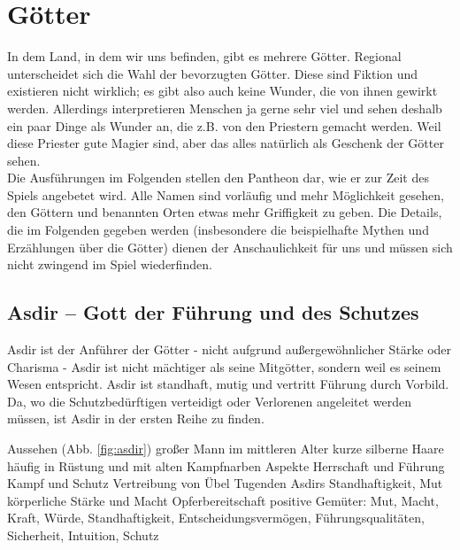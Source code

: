 \section{Götter}
In dem Land, in dem wir uns befinden, gibt es mehrere Götter. 
Regional unterscheidet sich die Wahl der bevorzugten Götter.
Diese sind Fiktion und existieren nicht wirklich; es gibt also auch keine Wunder, die von ihnen gewirkt werden. 
Allerdings interpretieren Menschen ja gerne sehr viel und sehen deshalb ein paar Dinge als Wunder an, die z.B. von den Priestern gemacht werden. 
Weil diese Priester gute Magier sind, aber das alles natürlich als Geschenk der Götter sehen.\\

Die Ausführungen im Folgenden stellen den Pantheon dar, wie er zur Zeit des Spiels angebetet wird.
Alle Namen sind vorläufig und mehr Möglichkeit gesehen, den Göttern und benannten Orten etwas mehr Griffigkeit zu geben.
Die Details, die im Folgenden gegeben werden (insbesondere die beispielhafte Mythen und Erzählungen über die Götter) dienen der Anschaulichkeit für uns und müssen sich nicht zwingend im Spiel wiederfinden.




\subsection{Asdir -- Gott der Führung und des Schutzes}
Asdir ist der Anführer der Götter - nicht aufgrund außergewöhnlicher Stärke oder Charisma - Asdir ist nicht mächtiger als seine Mitgötter, sondern weil es seinem Wesen entspricht. 
Asdir ist standhaft, mutig und vertritt Führung durch Vorbild. 
Da, wo die Schutzbedürftigen verteidigt oder Verlorenen angeleitet werden müssen, ist Asdir in der ersten Reihe zu finden.
\begin{outline}
	\1 Aussehen (Abb. \ref{fig:asdir})
		\2 großer Mann im mittleren Alter
		\2 kurze silberne Haare
		\2 häufig in Rüstung und mit alten Kampfnarben
	\1 Aspekte
		\2 Herrschaft und Führung
		\2 Kampf und Schutz
		\2 Vertreibung von Übel
	\1 Tugenden Asdirs
		\2 Standhaftigkeit, Mut
		\2 körperliche Stärke und Macht
		\2 Opferbereitschaft
	\1 positive Gemüter: Mut, Macht, Kraft, Würde, Standhaftigkeit, Entscheidungsvermögen, Führungsqualitäten, Sicherheit, Intuition, Schutz
\end{outline}

